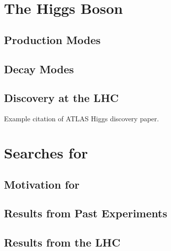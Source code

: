 \section{The Higgs Boson}

\subsection{Production Modes}

\subsection{Decay Modes}

\subsection{Discovery at the LHC}

Example citation of ATLAS Higgs discovery paper. \cite{ATLASHiggsDiscovery}

\section{Searches for \VHbb}

\subsection{Motivation for \VHbb}

\subsection{Results from Past Experiments}

\subsection{Results from the LHC}



